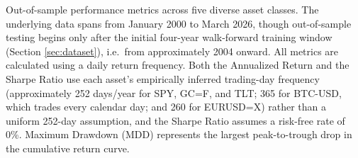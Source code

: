 \documentclass[pdflatex,sn-mathphys-num]{sn-jnl}
\theoremstyle{thmstyleone}%
\theoremstyle{thmstyletwo}%
\theoremstyle{thmstylethree}%
\begin{document}
\begin{table}
    \centering
    \caption{Out-of-sample performance metrics across five diverse asset classes. The underlying data spans from January 2000 to March 2026, though out-of-sample testing begins only after the initial four-year walk-forward training window (Section \ref{sec:dataset}), i.e.\ from approximately 2004 onward. All metrics are calculated using a daily return frequency. Both the Annualized Return and the Sharpe Ratio use each asset's empirically inferred trading-day frequency (approximately 252 days/year for SPY, GC=F, and TLT; 365 for BTC-USD, which trades every calendar day; and 260 for EURUSD=X) rather than a uniform 252-day assumption, and the Sharpe Ratio assumes a risk-free rate of 0\%. Maximum Drawdown (MDD) represents the largest peak-to-trough drop in the cumulative return curve.}
    \label{tab:main_results}
    
    
    \setlength{\tabcolsep}{3pt} 
    \scriptsize 
    

\end{table}
\end{document}
